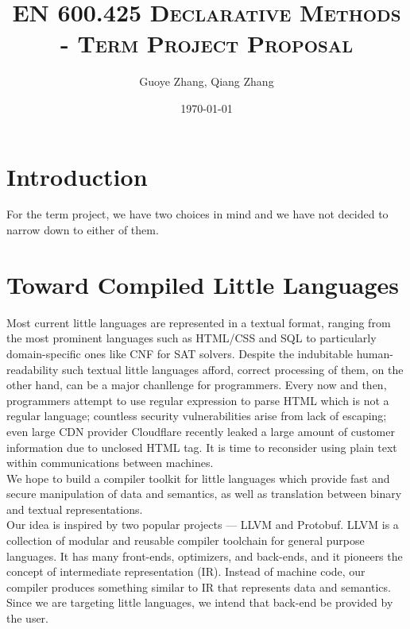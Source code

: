 \documentclass{article}
\begin{document}
\title{\textsc{EN 600.425 Declarative Methods \\ - Term Project Proposal}} %
\author{Guoye Zhang, Qiang Zhang\\
        }  %
\date{\today}  %
\maketitle

\section{Introduction}
For the term project, we have two choices in mind and we have not decided to narrow down to either of them. 
\section{Toward Compiled Little Languages}

Most current little languages are represented in a textual format, ranging from the most prominent languages such as HTML/CSS and SQL to particularly domain-specific ones like CNF for SAT solvers. Despite the indubitable human-readability such textual little languages afford, correct processing of them, on the other hand, can be a major chanllenge for programmers. Every now and then, programmers attempt to use regular expression to parse HTML which is not a regular language; countless security vulnerabilities arise from lack of escaping; even large CDN provider Cloudflare recently leaked a large amount of customer information due to unclosed HTML tag. It is time to reconsider using plain text within communications between machines.\\

We hope to build a compiler toolkit for little languages which provide fast and secure manipulation of data and semantics, as well as translation between binary and textual representations.\\

Our idea is inspired by two popular projects --- LLVM and Protobuf. LLVM is a collection of modular and reusable compiler toolchain for general purpose languages. It has many front-ends, optimizers, and back-ends, and it pioneers the concept of intermediate representation (IR). Instead of machine code, our compiler produces something similar to IR that represents data and semantics. Since we are targeting little languages, we intend that back-end be provided by the user.\\
\end{document}
